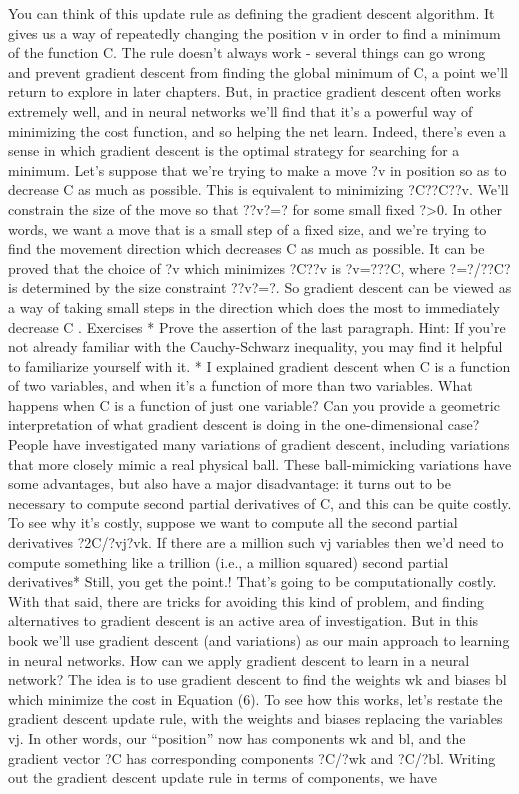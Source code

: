 You can think of this update rule as defining the gradient descent algorithm. It gives us a way of repeatedly changing the position v in order to find a minimum of the function C. The rule doesn't always work - several things can go wrong and prevent gradient descent from finding the global minimum of C, a point we'll return to explore in later chapters. But, in practice gradient descent often works extremely well, and in neural networks we'll find that it's a powerful way of minimizing the cost function, and so helping the net learn.
Indeed, there's even a sense in which gradient descent is the optimal strategy for searching for a minimum. Let's suppose that we're trying to make a move ?v in position so as to decrease C as much as possible. This is equivalent to minimizing ?C??C??v. We'll constrain the size of the move so that ??v?=? for some small fixed ?>0. In other words, we want a move that is a small step of a fixed size, and we're trying to find the movement direction which decreases C as much as possible. It can be proved that the choice of ?v which minimizes ?C??v is ?v=???C, where ?=?/??C? is determined by the size constraint ??v?=?. So gradient descent can be viewed as a way of taking small steps in the direction which does the most to immediately decrease C
.
Exercises
* Prove the assertion of the last paragraph. Hint: If you're not already familiar with the Cauchy-Schwarz inequality, you may find it helpful to familiarize yourself with it.
* I explained gradient descent when C is a function of two variables, and when it's a function of more than two variables. What happens when C is a function of just one variable? Can you provide a geometric interpretation of what gradient descent is doing in the one-dimensional case? 
People have investigated many variations of gradient descent, including variations that more closely mimic a real physical ball. These ball-mimicking variations have some advantages, but also have a major disadvantage: it turns out to be necessary to compute second partial derivatives of C, and this can be quite costly. To see why it's costly, suppose we want to compute all the second partial derivatives ?2C/?vj?vk. If there are a million such vj variables then we'd need to compute something like a trillion (i.e., a million squared) second partial derivatives* 
Still, you get the point.! That's going to be computationally costly. With that said, there are tricks for avoiding this kind of problem, and finding alternatives to gradient descent is an active area of investigation. But in this book we'll use gradient descent (and variations) as our main approach to learning in neural networks.
How can we apply gradient descent to learn in a neural network? The idea is to use gradient descent to find the weights wk and biases bl which minimize the cost in Equation (6). To see how this works, let's restate the gradient descent update rule, with the weights and biases replacing the variables vj. In other words, our ``position'' now has components wk and bl, and the gradient vector ?C has corresponding components ?C/?wk and ?C/?bl. Writing out the gradient descent update rule in terms of components, we have 

